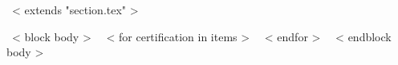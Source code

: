 ~< extends "section.tex" >~

~< block body >~
~< for certification in items >~
~< endfor >~
~< endblock body >~
